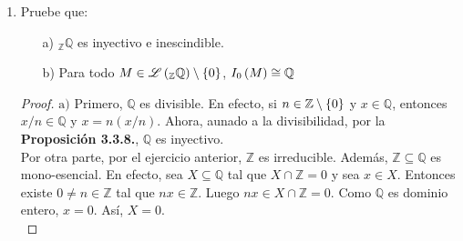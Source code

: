 \documentclass{article}
\newcommand{\socle}[1]{
	Soc\lrprth{#1}
}
\begin{document}
\begin{enumerate}[label=\textbf{Ej \arabic*.}]
\begin{proof}
		 Supongamos que $Soc\lrprth{M}\neq\gengroup{0}$, entonces $Simp\lrprth{M}\neq\varnothing$ y así sea $N\in\genlin{M}\neq\lrbrack{\gengroup{0}}$ simple. Como  $N\subseteq Soc\lrprth{M}$, pues $Soc\lrprth{M}$ está generado por $\bigcup Simp\lrprth{M}$, entonces si $i_N$ es la inclusión de $N$ en $M$, ${i_N}'$ la de $N$ en $Soc\lrprth{M}$ e $i_{\socle{M}}$ la de $Soc\lrprth{M}$ en $M$, se tiene la siguiente sucesión
		\begin{equation*}
			\shortseq{A=N, B=\socle{M},C=M, AtoB={i_N}', BtoC=i_{\socle{M}},lcr=c,},
		\end{equation*} con $i_N=i_{\socle{M}}{i_N}'$. Por lo anterior, como $i_N$ es un mono-esencial por ser $M$ irreducible y todas las inclusiones antes mencionadas son monomorfismos, aplicando la Proposición 3.3.3 $a)$ se tiene que, en partícular, ${i_N}'$ es un mono-esencial. Así, dado que $\socle{M}$ es semisimple, de la Proposición 3.3.3 $b)$ se tiene que ${i_N}'$ es un isomorfismo. De modo que $\socle{M}=N$ y por lo tanto es simple.\\
		
		 Se tiene que $\socle{M}$ es semisimple, de lo cual se sigue la sucificiencia. Más aún se tiene que $\socle{M}$ es el máximo submódulo semisimple de $M$ (ver la Proposición 3.3.6$a)$), de modo que $M\leq \socle{M}$ si $M$ es semisimple y así se verifica la necesidad. \\
		
		 Se sigue de aplicar el inciso anterior al modulo semisimple $M':=\socle{M}$.\\
		\end{proof}

		\item Pruebe que:
		\begin{itemize}
			\item[a)] ${}_{\mathbb{Z}}\mathbb{Q}$ es inyectivo e inescindible.
			\item[b)] Para todo $M\in\mathscr{L}\left({}_{\mathbb{Z}}\mathbb{Q}\right)\setminus\left\{0\right\}$, $I_{0}\left(M\right)\cong\mathbb{Q}$
		\end{itemize}
		\begin{proof}
			$\boxed{\text{a)}}$ Primero, $\mathbb{Q}$ es divisible. En efecto, si $n\in\mathbb{Z}\setminus\left\{0\right\}$ y $x\in\mathbb{Q}$, entonces $x/n\in\mathbb{Q}$ y $x=n(x/n)$. Ahora, aunado a la divisibilidad, por la \textbf{Proposición 3.3.8.}, $\mathbb{Q}$ es inyectivo.\\
		
			Por otra parte, por el ejercicio anterior, $\mathbb{Z}$ es irreducible. Además, $\mathbb{Z}\subseteq\mathbb{Q}$ es mono-esencial. En efecto, sea $X\subseteq\mathbb{Q}$ tal que $X\cap\mathbb{Z}=0$ y sea $x \in X$. Entonces existe $0 \neq n\in\mathbb{Z}$ tal que $nx\in\mathbb{Z}$. Luego $nx \in X\cap\mathbb{Z}=0$. Como $\mathbb{Q}$ es dominio entero, $x=0$. Así, $X=0$.\\
		

\end{proof}
\end{enumerate}
\end{document}
